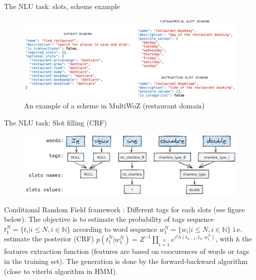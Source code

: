 \documentclass[10pt,aspectratio=169]{beamer}
\begin{document}
\begin{frame}{The NLU task: slots, scheme example}
    \begin{figure}
        \centering
        \includegraphics[width=1.\textwidth]{media/example_scheme.png}
        \caption{An example of a scheme in MultiWoZ (restaurant domain)}
        \label{fig:my_label}
    \end{figure}
\end{frame}

\begin{frame}{The NLU task: Slot filling (CRF)}

    \begin{figure}
        \centering
        \includegraphics[width=.75\textwidth]{media/hahn_figure_crf.png}
        \label{fig:hahn-split}
    \end{figure}
    \begin{block}{Conditional Random Field framework \cite{hahn-2011-comparing}:}
        Different tags for each slots (see figure below). The objective is to estimate the probability of tags sequence $t_1^N =  \{t_i| i \leq N, i \in \mathbb{N} \}$ according to word sequence $w_1^N = \{w_i| i \leq N, i \in \mathbb{N} \}$ i.e. estimate the posterior (CRF) $p(t_1^N|w_1^N) = Z^{-1} \prod_{i=1}\limits^N e^{v^th(t_{n-1}, t_{n}, w_1^N)}$, with $h$ the features extraction function (features are based on coocurences of words or tags in the training set). The generation is done by the forward-backward algorithm (close to viterbi algorithm in HMM).
    \end{block}
\end{frame}
\end{document}
